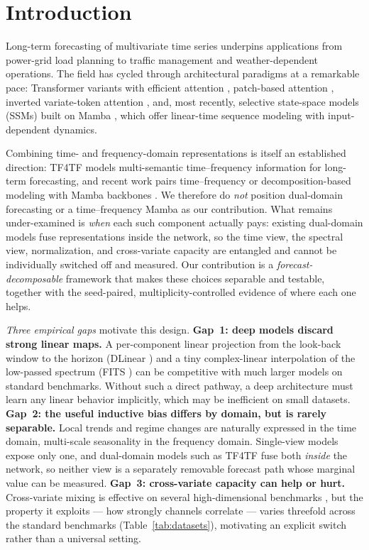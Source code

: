 \documentclass[review,12pt]{elsarticle}
\begin{document}
\section{Introduction}

Long-term forecasting of multivariate time series underpins applications
from power-grid load planning to traffic management and weather-dependent
operations. The field has cycled through architectural paradigms at a
remarkable pace: Transformer variants with efficient attention
\cite{informer,autoformer,fedformer}, patch-based attention
\cite{patchtst}, inverted variate-token attention \cite{itransformer},
and, most recently, selective state-space models (SSMs) built on Mamba
\cite{mamba,smamba,msmamba}, which offer linear-time sequence modeling with
input-dependent dynamics.

Combining time- and frequency-domain representations is itself an
established direction: TF4TF \cite{tf4tf} models multi-semantic
time--frequency information for long-term forecasting, and recent work pairs
time--frequency or decomposition-based modeling with Mamba backbones
\cite{decmamba,msmamba}. We therefore do \emph{not} position dual-domain
forecasting or a time--frequency Mamba as our contribution. What remains
under-examined is \emph{when} each such component actually pays: existing
dual-domain models fuse representations inside the network, so the time
view, the spectral view, normalization, and cross-variate capacity are
entangled and cannot be individually switched off and measured. Our
contribution is a \emph{forecast-decomposable} framework that makes these
choices separable and testable, together with the seed-paired,
multiplicity-controlled evidence of where each one helps.

\emph{Three empirical gaps} motivate this design. \textbf{Gap~1: deep
models discard strong linear maps.} A per-component linear projection from
the look-back window to the horizon (DLinear \cite{dlinear}) and a tiny
complex-linear interpolation of the low-passed spectrum (FITS \cite{fits})
can be competitive with much larger models on standard benchmarks. Without
such a direct pathway, a deep architecture must learn any linear behavior
implicitly, which may be inefficient on small datasets.
\textbf{Gap~2: the useful inductive bias differs by domain, but is rarely
separable.} Local trends and regime changes are naturally expressed in the
time domain, multi-scale seasonality in the frequency domain. Single-view
models \cite{frets} expose only one, and dual-domain models such as TF4TF
\cite{tf4tf} fuse both \emph{inside} the network, so neither view is a
separately removable forecast path whose marginal value can be measured.
\textbf{Gap~3: cross-variate capacity can help or hurt.} Cross-variate
mixing is effective on several high-dimensional benchmarks
\cite{itransformer,smamba,crossformer}, but the property it exploits ---
how strongly channels correlate --- varies threefold across the standard
benchmarks (Table~\ref{tab:datasets}), motivating an explicit switch rather
than a universal setting.
\end{document}

